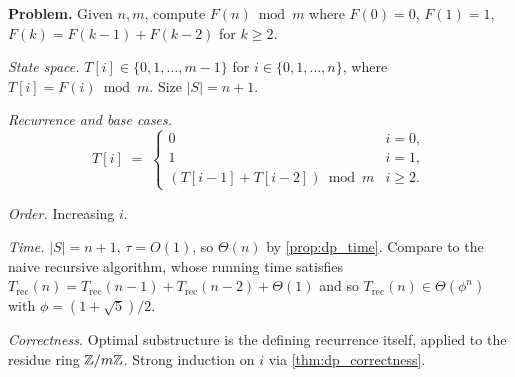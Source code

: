 \begin{example}
\label{ex:fibonacci}
\textbf{Problem.} Given $n, m$, compute $F(n) \bmod m$ where $F(0) = 0$, $F(1) = 1$, $F(k) = F(k-1) + F(k-2)$ for $k \ge 2$.

\medskip
\noindent\textit{State space.} $T[i] \in \{0, 1, \dots, m-1\}$ for $i \in \{0, 1, \dots, n\}$, where $T[i] = F(i) \bmod m$. Size $|S| = n+1$.

\medskip
\noindent\textit{Recurrence and base cases.}
\[
  T[i] \;=\; \begin{cases} 0 & i = 0, \\ 1 & i = 1, \\ (T[i-1] + T[i-2]) \bmod m & i \ge 2. \end{cases}
\]

\medskip
\noindent\textit{Order.} Increasing $i$.

\medskip
\noindent\textit{Time.} $|S| = n+1$, $\tau = O(1)$, so $\Theta(n)$ by \cref{prop:dp_time}. Compare to the naive recursive algorithm, whose running time satisfies $T_{\text{rec}}(n) = T_{\text{rec}}(n-1) + T_{\text{rec}}(n-2) + \Theta(1)$ and so $T_{\text{rec}}(n) \in \Theta(\phi^n)$ with $\phi = (1 + \sqrt 5)/2$.

\medskip
\noindent\textit{Correctness.} Optimal substructure is the defining recurrence itself, applied to the residue ring $\mathbb{Z}/m\mathbb{Z}$. Strong induction on $i$ via \cref{thm:dp_correctness}.
\end{example}

